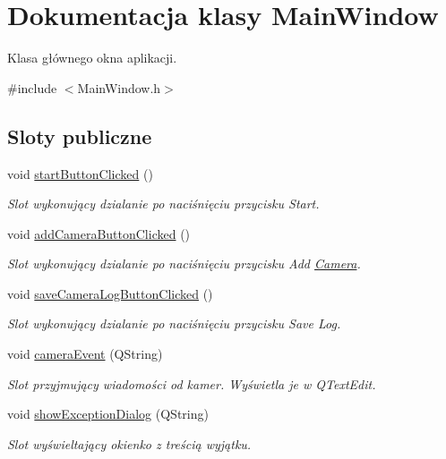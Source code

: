 \hypertarget{class_main_window}{\section{Dokumentacja klasy Main\-Window}
\label{class_main_window}
}


Klasa głównego okna aplikacji.  




{\ttfamily \#include $<$Main\-Window.\-h$>$}

\subsection*{Sloty publiczne}
\begin{DoxyCompactItemize}
\item 
void \hyperlink{class_main_window_a524779fedd6fbedd87913f9e38d059aa}{start\-Button\-Clicked} ()
\begin{DoxyCompactList}\small\item\em Slot wykonujący dzialanie po naciśnięciu przycisku Start. \end{DoxyCompactList}\item 
void \hyperlink{class_main_window_ad59e90d0dd01444e222c94421dbfb1aa}{add\-Camera\-Button\-Clicked} ()
\begin{DoxyCompactList}\small\item\em Slot wykonujący dzialanie po naciśnięciu przycisku Add \hyperlink{class_camera}{Camera}. \end{DoxyCompactList}\item 
void \hyperlink{class_main_window_a391c23cbe0aea03008357c96c89d79e0}{save\-Camera\-Log\-Button\-Clicked} ()
\begin{DoxyCompactList}\small\item\em Slot wykonujący dzialanie po naciśnięciu przycisku Save Log. \end{DoxyCompactList}\item 
void \hyperlink{class_main_window_acfe9790838bda5b46ccc90c2760822ba}{camera\-Event} (Q\-String)
\begin{DoxyCompactList}\small\item\em Slot przyjmujący wiadomości od kamer. Wyświetla je w Q\-Text\-Edit. \end{DoxyCompactList}\item 
void \hyperlink{class_main_window_a52d6970c3dcddf7c1ed65ff435743bc3}{show\-Exception\-Dialog} (Q\-String)
\begin{DoxyCompactList}\small\item\em Slot wyświeltający okienko z treścią wyjątku. \end{DoxyCompactList}\end{DoxyCompactItemize}
